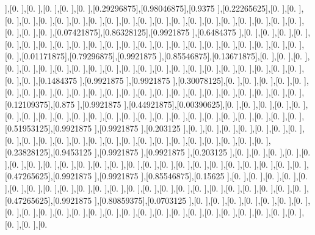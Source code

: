 \documentclass[titlepage]{article}
\begin{document}
],[0.        ],[0.        ],[0.        ],[0.        ],[0.        ],[0.29296875],[0.98046875],[0.9375    ],[0.22265625],[0.        ],[0.        ],[0.        ],[0.        ],[0.        ],[0.        ],[0.        ],[0.        ],[0.        ],[0.        ],[0.        ],[0.        ],[0.        ],[0.        ],[0.        ],[0.        ],[0.        ],[0.        ],[0.        ],[0.        ],[0.        ],[0.        ],[0.        ],[0.07421875],[0.86328125],[0.9921875 ],[0.6484375 ],[0.        ],[0.        ],[0.        ],[0.        ],[0.        ],[0.        ],[0.        ],[0.        ],[0.        ],[0.        ],[0.        ],[0.        ],[0.        ],[0.        ],[0.        ],[0.        ],[0.        ],[0.        ],[0.        ],[0.        ],[0.        ],[0.        ],[0.        ],[0.01171875],[0.79296875],[0.9921875 ],[0.85546875],[0.13671875],[0.        ],[0.        ],[0.        ],[0.        ],[0.        ],[0.        ],[0.        ],[0.        ],[0.        ],[0.        ],[0.        ],[0.        ],[0.        ],[0.        ],[0.        ],[0.        ],[0.        ],[0.        ],[0.        ],[0.        ],[0.        ],[0.        ],[0.        ],[0.1484375 ],[0.9921875 ],[0.9921875 ],[0.30078125],[0.        ],[0.        ],[0.        ],[0.        ],[0.        ],[0.        ],[0.        ],[0.        ],[0.        ],[0.        ],[0.        ],[0.        ],[0.        ],[0.        ],[0.        ],[0.        ],[0.        ],[0.        ],[0.        ],[0.        ],[0.        ],[0.        ],[0.        ],[0.12109375],[0.875     ],[0.9921875 ],[0.44921875],[0.00390625],[0.        ],[0.        ],[0.        ],[0.        ],[0.        ],[0.        ],[0.        ],[0.        ],[0.        ],[0.        ],[0.        ],[0.        ],[0.        ],[0.        ],[0.        ],[0.        ],[0.        ],[0.        ],[0.        ],[0.        ],[0.        ],[0.        ],[0.        ],[0.51953125],[0.9921875 ],[0.9921875 ],[0.203125  ],[0.        ],[0.        ],[0.        ],[0.        ],[0.        ],[0.        ],[0.        ],[0.        ],[0.        ],[0.        ],[0.        ],[0.        ],[0.        ],[0.        ],[0.        ],[0.        ],[0.        ],[0.        ],[0.        ],[0.        ],[0.        ],[0.        ],[0.        ],[0.23828125],[0.9453125 ],[0.9921875 ],[0.9921875 ],[0.203125  ],[0.        ],[0.        ],[0.        ],[0.        ],[0.        ],[0.        ],[0.        ],[0.        ],[0.        ],[0.        ],[0.        ],[0.        ],[0.        ],[0.        ],[0.        ],[0.        ],[0.        ],[0.        ],[0.        ],[0.        ],[0.        ],[0.        ],[0.        ],[0.47265625],[0.9921875 ],[0.9921875 ],[0.85546875],[0.15625   ],[0.        ],[0.        ],[0.        ],[0.        ],[0.        ],[0.        ],[0.        ],[0.        ],[0.        ],[0.        ],[0.        ],[0.        ],[0.        ],[0.        ],[0.        ],[0.        ],[0.        ],[0.        ],[0.        ],[0.        ],[0.        ],[0.        ],[0.        ],[0.47265625],[0.9921875 ],[0.80859375],[0.0703125 ],[0.        ],[0.        ],[0.        ],[0.        ],[0.        ],[0.        ],[0.        ],[0.        ],[0.        ],[0.        ],[0.        ],[0.        ],[0.        ],[0.        ],[0.        ],[0.        ],[0.        ],[0.        ],[0.        ],[0.        ],[0.        ],[0.        ],[0.        ],[0.        ],[0.        ],[0.        ],[0.        ],[0.   
\end{document}
